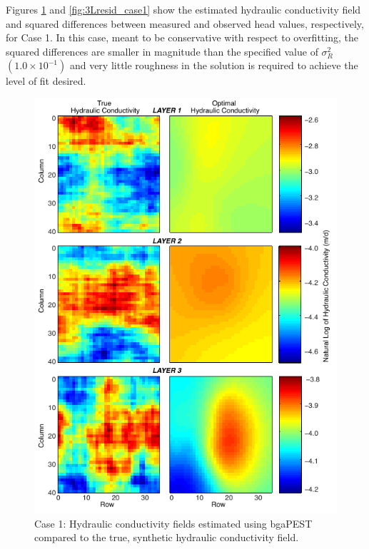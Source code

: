 \documentclass[11pt,oneside,onecolumn]{usgsreport}
\begin{document}
\begin{appendix}
\begin{table}[!t]
\end{table}


Figures \ref{fig:3LK_case1} and \ref{fig:3Lresid_case1} show the
estimated hydraulic conductivity field and squared differences between
measured and observed head values, respectively, for Case 1. In this
case, meant to be conservative with respect to overfitting, the squared
differences are smaller in magnitude than the specified value of $\sigma_{R}^{2}$
$\left(1.0\times10^{-1}\right)$ and very little roughness in the
solution is required to achieve the level of fit desired.

\clearpage

\begin{figure}[!t]
\begin{center}\includegraphics{figures/3KL_case1}\end{center}

\caption{\label{fig:3LK_case1}Case 1: Hydraulic conductivity fields estimated
using bgaPEST compared to the true, synthetic hydraulic conductivity
field.}
\end{figure}



\end{appendix}
\end{document}
